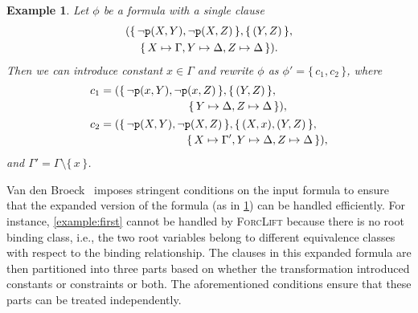 \documentclass{article}
\newtheorem{example}{Example}
\newcommand{\predicate}{\texttt{\textup{p}}}
\begin{document}
\begin{example}\label{example:dr}
  Let $\phi$ be a formula with a single clause
  \begin{multline*}
    (\{\, \neg \predicate(X, Y), \neg \predicate(X, Z) \,\}, \{\, (Y, Z) \,\}, \\
    \{\, X \mapsto \Gamma, Y \mapsto \Delta, Z \mapsto \Delta \,\}).
  \end{multline*}
  Then we can introduce constant $x \in \Gamma$ and rewrite $\phi$ as
  $\phi' = \{\, c_{1}, c_{2} \,\}$, where
  \begin{align*}
    c_{1} &= \begin{multlined}[t]
      (\{\, \neg \predicate(x, Y), \neg \predicate(x, Z) \,\}, \{\, (Y, Z) \,\}, \\
      \{\, Y \mapsto \Delta, Z \mapsto \Delta \,\}),
      \end{multlined}\\
    c_{2} &= \begin{multlined}[t]
      (\{\, \neg \predicate(X, Y), \neg \predicate(X, Z) \,\}, \{\, (X, x), (Y, Z) \,\}, \\
      \{\, X \mapsto \Gamma', Y \mapsto \Delta, Z \mapsto \Delta \,\}),
      \end{multlined}
  \end{align*}
  and $\Gamma' = \Gamma \setminus \{\, x \,\}$.
\end{example}

Van den Broeck~ imposes stringent conditions
on the input formula to ensure that the expanded version of the formula (as in
\cref{example:dr}) can be handled efficiently. For instance,
\cref{example:first} cannot be handled by \textsc{ForcLift} because there is no
root binding class, i.e., the two root variables belong to different equivalence
classes with respect to the binding relationship. The clauses in this expanded
formula are then partitioned into three parts based on whether the
transformation introduced constants or constraints or both. The aforementioned
conditions ensure that these parts can be treated independently.
\end{document}
